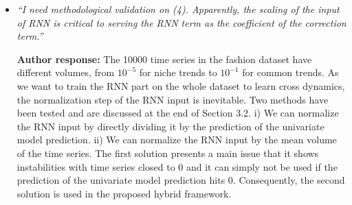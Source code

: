 \documentclass[10pt]{article} %
\begin{document}
\begin{itemize}
	\item {\em ``I need methodological validation on (4). Apparently, the scaling of the input of RNN is critical to serving the RNN term as the coefficient of the correction term.''} \medskip
	
	\textbf{Author response:} The 10000 time series in the fashion dataset have different volumes, from $10^{-5}$ for niche trends to $10^{-1}$ for common trends. As we want to train the RNN part on the whole dataset to learn cross dynamics, the normalization step of the RNN input is inevitable. Two methods have been tested and are discussed at the end of Section 3.2. i) We can normalize the RNN input by directly dividing it by the prediction of the univariate model prediction. ii) We can normalize the RNN input by the mean volume of the time series. The first solution presents a main issue that it shows instabilities with time series closed to 0 and it can simply not be used if the prediction of the univariate model prediction hits 0. Consequently, the second solution is used in the proposed hybrid framework.\\
\end{itemize}
\end{document}
